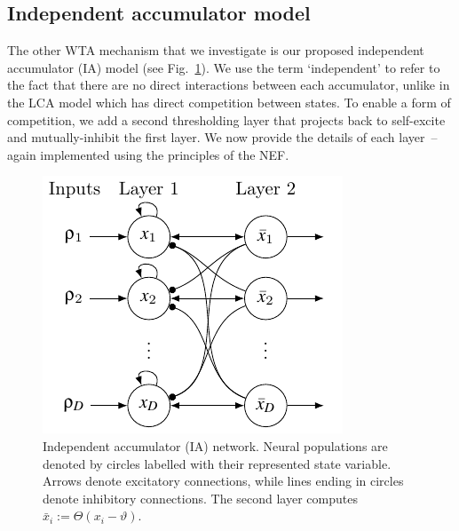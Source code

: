\documentclass[10pt,letterpaper]{article}
\begin{document}
\subsection{Independent accumulator model}
The other WTA mechanism that we investigate is our proposed independent accumulator (IA) model (see Fig.~\ref{fig:ia-sketch}).
We use the term `independent' to refer to the fact that there are no direct interactions between each accumulator, unlike in the LCA model which has direct competition between states.
To enable a form of competition, we add a second thresholding layer that  projects back to self-excite and mutually-inhibit the first layer.
We now provide the details of each layer~-- again implemented using the principles of the NEF\@.
\begin{figure}
    \centering
    \includegraphics{figures/ia-sketch}
    \caption{
        Independent accumulator (IA) network.
        Neural populations are denoted by circles labelled with their represented state variable.
        Arrows denote excitatory connections, while lines ending in circles denote inhibitory connections.
        The second layer computes $\bar{x}_i := \Theta(x_i - \vartheta)$.
    }\label{fig:ia-sketch}
\end{figure}
\end{document}
